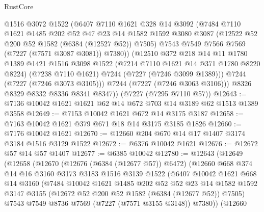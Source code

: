 \begin{lexlean}{RustCore}
\begin{coremodule}
            @1516
            @3072
            @1522
            (@6407
              @7110
              @1621
              @328
              @14
              @3092
              (@7484
                @7110
                @1621
                @1485
                @202
                @52
                @47
                @23
                @14
                @1582
                @1592
                @3080
                @3087
                (@12522 @52 @200 @52 @1582 (@6384 (@12527 @52)) @7505)
                @7543
                @7549
                @7566
                @7569
                (@7227 (@7571 @3087 @3081))
                @7380))
            (@12510
              @372
              @218
              @14
              @11
              @1780
              @1389
              @1421
              @1516
              @3098
              @1522
              (@7214 @7110 @1621 @14 @371 @1780 @8220 @8224)
              (@7238 @7110 @1621)
              @7244
              (@7227 (@7246 @3099 @1389)))
            @7244
            (@7227 (@7246 @3073 @3105)))
          @7244
          (@7227 (@7246 @3063 @3106)))
        @8326
        @8329
        @8332
        @8336
        @8341
        @8347))
    (@7227 (@7295 @7110 @57))
@12643 := @7136 @10042 @1621 @1621 @62 @14 @672 @703 @14 @3189 @62 @1513 @1389 @3558
@12649 := @7153 @10042 @1621 @672 @14 @3175 @3187
@12658 := @7163 @10042 @1621 @379 @671 @18 @14 @3175 @3185 @1826
@12660 := @7176 @10042 @1621
@12670 := @12660 @204 @670 @14 @17 @1407 @3174 @3184 @1516 @3129 @1522
@12672 := @6376 @10042 @1621
@12676 := @12672 @57 @14 @57 @1407
@12677 := @6385 @10042
@12780 := @12643
    (@12649
      (@12658
        (@12670
          (@12676 (@6384 (@12677 @57)) @6472)
          (@12660
            @668
            @374
            @14
            @16
            @3160
            @3173
            @3183
            @1516
            @3139
            @1522
            (@6407
              @10042
              @1621
              @668
              @14
              @3160
              (@7484
                @10042
                @1621
                @1485
                @202
                @52
                @52
                @23
                @14
                @1582
                @1592
                @3147
                @3155
                (@12672 @52 @200 @52 @1582 (@6384 (@12677 @52)) @7505)
                @7543
                @7549
                @8736
                @7569
                (@7227 (@7571 @3155 @3148))
                @7380))
            (@12660

\end{coremodule}
\end{lexlean}
